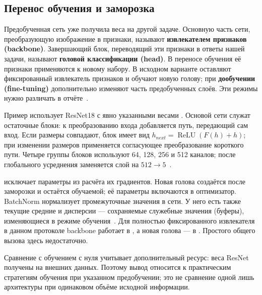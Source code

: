 \subsection{Перенос обучения и заморозка}
Предобученная сеть уже получила веса на другой задаче. Основную часть сети, преобразующую изображение в признаки, называют \textbf{извлекателем признаков (backbone)}. Завершающий блок, переводящий эти признаки в ответы нашей задачи, называют \textbf{головой классификации (head)}. В переносе обучения её признаки применяются к новому набору. В исходном варианте оставляют фиксированный извлекатель признаков и обучают новую голову; при \textbf{дообучении (fine-tuning)} дополнительно изменяют часть предобученных слоёв. Эти режимы нужно различать в отчёте~\cite{transfer}.

Пример использует ResNet18 с явно указанными весами . Основой сети служат остаточные блоки: к преобразованию входа добавляется путь, передающий сам вход. Если размеры совпадают, блок имеет вид \(h_{next}=\operatorname{ReLU}(F(h)+h)\); при изменении размеров применяется согласующее преобразование короткого пути. Четыре группы блоков используют 64, 128, 256 и 512 каналов; после глобального усреднения заменяется слой  на \(512\to5\)~\cite{resnetpaper,resnet18}.

 исключает параметры из расчёта их градиентов. Новая голова создаётся после заморозки и остаётся обучаемой; её параметры включаются в оптимизатор. BatchNorm нормализует промежуточные значения в сети. У него есть также текущие средние и дисперсии --- сохраняемые служебные значения (буферы), изменяющиеся в режиме обучения~\cite{batchnorm}. Для полностью фиксированного извлекателя в данном протоколе backbone работает в , а новая голова --- в . Простого общего вызова  здесь недостаточно.

Сравнение с обучением с нуля учитывает дополнительный ресурс: веса ResNet получены на внешних данных. Поэтому вывод относится к практическим стратегиям обучения при указанном предобучении; это не сравнение одной лишь архитектуры при одинаковом объёме исходной информации.
